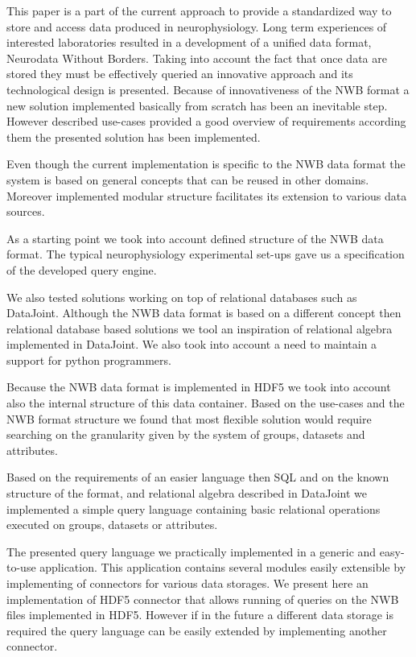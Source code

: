 \documentclass[utf8]{frontiersSCNS} %
\begin{document}
This paper is a part of the current approach to provide a standardized way to store and access data produced in neurophysiology. Long term experiences of interested laboratories resulted in a development of a unified data format, Neurodata Without Borders. Taking into account the fact that once data are stored they must be effectively queried an innovative approach and its technological design is presented. Because of innovativeness of the NWB format a new solution implemented basically from scratch has been an inevitable step. However described use-cases provided a good overview of requirements according them the presented solution has been implemented.

Even though the current implementation is specific to the NWB data format the system is based on general concepts that can be reused in other domains. Moreover implemented modular structure facilitates its extension to various data sources.

As a starting point we took into account defined structure of the NWB data format. The typical neurophysiology experimental set-ups gave us a specification of the developed query engine. 

We also tested solutions working on top of relational databases such as DataJoint. Although the NWB data format is based on a different concept then relational database based solutions we tool an inspiration of relational algebra implemented in DataJoint. We also took into account a need to maintain a support for python programmers. 

Because the NWB data format is implemented in HDF5 we took into account also the internal structure of this data container. Based on the use-cases and the NWB format structure we found that most flexible solution would require searching on the granularity given by the system of groups, datasets and attributes.

Based on the requirements of an easier language then SQL and on the known structure of the format, and relational algebra described in DataJoint we implemented a simple query language containing basic relational operations executed on groups, datasets or attributes.

The presented query language we practically implemented in a generic and easy-to-use application. This application contains several modules easily extensible by implementing of connectors for various data storages. We present here an implementation of HDF5 connector that allows running of queries on the NWB files implemented in HDF5. However if in the future a different data storage is required the query language can be easily extended by implementing another connector.
\end{document}
